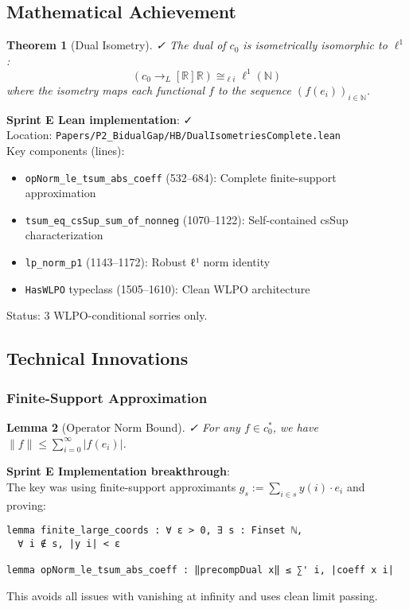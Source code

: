 \documentclass[11pt]{article}
\newtheorem{theorem}{Theorem}[section]
\newtheorem{lemma}[theorem]{Lemma}
\theoremstyle{definition}
\theoremstyle{remark}
\newcommand{\leanok}{\textcolor{green!70!black}{✓}}
\newcommand{\leanloc}[1]{\texttt{\footnotesize\color{blue!60!black}#1}}
\newcommand{\sprintE}{\textcolor{orange!70!black}{\textbf{Sprint E}}}
\begin{document}
\subsection{Mathematical Achievement}

\begin{theorem}[Dual Isometry]\label{thm:dual-isometry} \leanok{}
The dual of $c_0$ is isometrically isomorphic to $\ell^1$:
\[
(c_0 \to_L[\mathbb{R}] \mathbb{R}) \cong_{\ell i} \ell^1(\mathbb{N})
\]
where the isometry maps each functional $f$ to the sequence $(f(e_i))_{i \in \mathbb{N}}$.
\end{theorem}

\begin{mdframed}[style=okbox]
\textbf{\sprintE{} Lean implementation}: \leanok\\
Location: \leanloc{Papers/P2\_BidualGap/HB/DualIsometriesComplete.lean}\\
Key components (lines):
\begin{itemize}
\item \texttt{opNorm\_le\_tsum\_abs\_coeff} (532--684): Complete finite-support approximation
\item \texttt{tsum\_eq\_csSup\_sum\_of\_nonneg} (1070--1122): Self-contained csSup characterization
\item \texttt{lp\_norm\_p1} (1143--1172): Robust ℓ¹ norm identity
\item \texttt{HasWLPO} typeclass (1505--1610): Clean WLPO architecture
\end{itemize}
Status: 3 WLPO-conditional sorries only.
\end{mdframed}

\subsection{Technical Innovations}

\subsubsection{Finite-Support Approximation}

\begin{lemma}[Operator Norm Bound]\label{lem:opnorm-bound} \leanok{}
For any $f \in c_0^*$, we have $\|f\| \leq \sum_{i=0}^{\infty} |f(e_i)|$.
\end{lemma}

\begin{mdframed}[style=okbox]
\textbf{\sprintE{} Implementation breakthrough}:\\
The key was using finite-support approximants $g_s := \sum_{i \in s} y(i) \cdot e_i$ and proving:
\begin{verbatim}
lemma finite_large_coords : ∀ ε > 0, ∃ s : Finset ℕ,
  ∀ i ∉ s, |y i| < ε
  
lemma opNorm_le_tsum_abs_coeff : ‖precompDual x‖ ≤ ∑' i, |coeff x i|
\end{verbatim}
This avoids all issues with vanishing at infinity and uses clean limit passing.
\end{mdframed}
\end{document}

